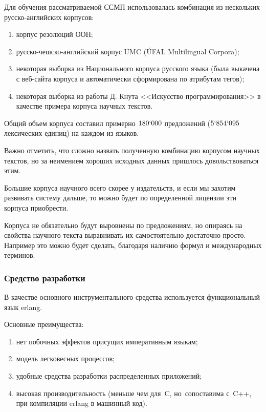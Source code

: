Для  обучения рассматриваемой ССМП использовалась комбинация из нескольких русско-английских корпусов:
{\renewcommand{\labelenumi}{\alph{enumi})}
	\begin{enumerate}
		\item корпус резолюций ООН;
		\item русско-чешско-английский корпус UMC (ÚFAL Multilingual Corpora);
		\item некоторая выборка из Национального корпуса русского языка 
			(была выкачена с веб-сайта корпуса и автоматически сформирована по атрибутам тегов);
		\item некоторая выборка из работы Д. Кнута <<Искусство программирования>> 
			в качестве примера корпуса научных текстов.
	\end{enumerate}
}

Общий объем корпуса составил примерно $180`000$ 
предложений ($5`854`095$ лексических единиц) на каждом из языков.

Важно отметить, что сложно назвать полученную комбинацию корпусом научных текстов,
но за неимением хороших исходных данных пришлось довольствоваться этим.

Большие корпуса научного всего скорее у издательств, и если мы 
захотим развивать систему дальше, 
то можно будет по определенной лицензии эти корпуса приобрести.

Корпуса не обязательно будут выровнены по предложениям, 
но опираясь на свойства научного текста выравнивать 
их самостоятельно достаточно просто. 
Например это можно будет сделать, благодаря наличию формул и 
международных терминов.

\pagebreak
\subsubsection{Средство разработки}

В качестве основного инструментального средства 
используется функциональный язык erlang.

Основные преимущества:
{\renewcommand{\labelenumi}{\alph{enumi})}
	\begin{enumerate}
		\item нет побочных эффектов присущих императивным языкам;
		\item модель легковесных процессов;
		\item удобные средства разработки распределенных приложений;
		\item высокая производительность (меньше чем для~C, но~сопоставима с~C++, 
			при компиляции erlang в машинный код).
	\end{enumerate}
}
	
